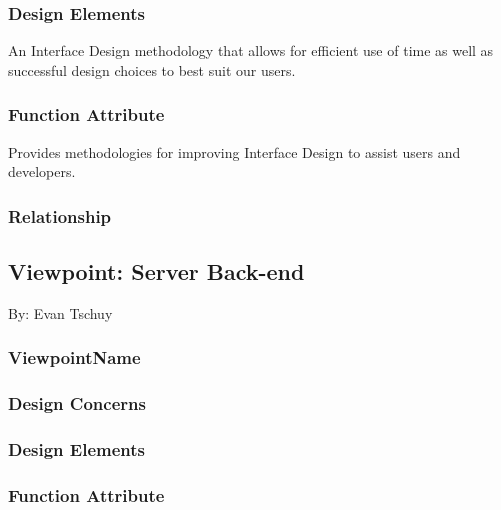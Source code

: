 \documentclass[letterpaper, 10pt, draftclsnofoot, compsoc, onecolumn]{IEEEtran}
\begin{document}
\subsubsection{Design Elements}
{\noindent An Interface Design methodology that allows for efficient 
use of time as well as successful design choices to best suit our users. \par}

\subsubsection{Function Attribute}
{\noindent Provides methodologies for improving Interface Design to assist 
users and developers. \par}

\subsubsection{Relationship}






\newpage
\subsection{Viewpoint: Server Back-end}
{\noindent By: Evan Tschuy \par}

\subsubsection{ViewpointName}
{\noindent  \par}

\subsubsection{Design Concerns}
{\noindent  \par}

\subsubsection{Design Elements}
{\noindent  \par}

\subsubsection{Function Attribute}
{\noindent  \par}
\end{document}
